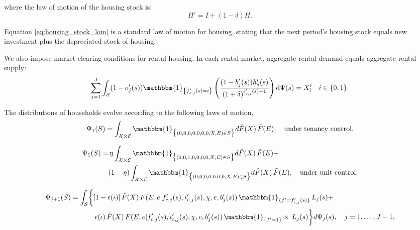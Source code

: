\documentclass[parskip=full]{article}
\begin{document}
\noindent where the law of motion of the housing stock is: 
\begin{equation}\label{eq:housing_stock_lom}
H'=I+(1-\delta)H.
\end{equation}

\noindent Equation \eqref{eq:housing_stock_lom} is a standard law of motion for housing, stating that the next period's housing stock equals new investment plus the depreciated stock of housing. 

We also impose market-clearing conditions for rental housing. In each rental market, aggregate rental demand equals aggregate rental supply:
\begin{equation}\label{eq:rental_housing_clearing_condition}
  \sum_{j=1}^J \int_\mathcal{S} (1-o'_{j}(s))\mathbbm{1}_{\left\{f'_{c,j}(s)=i\right\}}\left(\frac{(1-b'_{j}(s))h'_{j}(s)}{\left(1+\delta\right)^{\iota'_{c,j}(s)-1}}\right) \mathrm{d}\Psi(s) = X'_{i} \quad i \in \{0,1\}.
\end{equation}

The distributions of households evolve according to the following laws of motion,
\begin{equation}\label{eq:lom1}
\Psi_{1}(S) = \int_{\mathcal{X} \times \mathcal{E}} \mathbbm{1}_{\big\{ (0,0,0,0,0,0,0,X,E) \in S \big\}} d\hat{F}(X)\, \tilde{F}(E), \quad \text{under tenancy control.}
\end{equation}

\begin{equation}\label{eq:lom1_2}
\begin{split}
\Psi_{1}(S) = & \, \eta \int_{\mathcal{X} \times \mathcal{E}} \mathbbm{1}_{\big\{ (0,0,1,0,0,0,0,X,E) \in S \big\}} d\hat{F}(X)\, \tilde{F}(E)+ \\ & (1-\eta) \int_{\mathcal{X} \times \mathcal{E}} \mathbbm{1}_{\big\{ (0,0,0,0,0,0,0,X,E) \in S \big\}} d\hat{F}(X)\, \tilde{F}(E), \quad \text{under unit control.}
\end{split}
\end{equation}

\begin{equation}\label{eq:lom2}
\begin{split}
\Psi_{j+1}(S) = \int_{\mathcal{S}} \biggl\{ 
& [1-\epsilon(\iota)]\, \hat{F}(X)\, F(E,e | f'_{c,j}(s), \iota'_{c,j}(s), \chi, e, b'_j(s))\, \mathbbm{1}_{\{ f' = f'_{c,j}(s) \}}\, L_j(s)+ \\ & \, \epsilon(\iota)\, \hat{F}(X)\, F(E,e | f'_{c,j}(s), \iota'_{c,j}(s), \chi, e, b'_j(s))\, \mathbbm{1}_{\{ f' = 1 \}} \times \, L_j(s)
\biggr\} d\Psi_j(s), \quad j=1,\ldots,J-1,
\end{split}
\end{equation}
\end{document}
